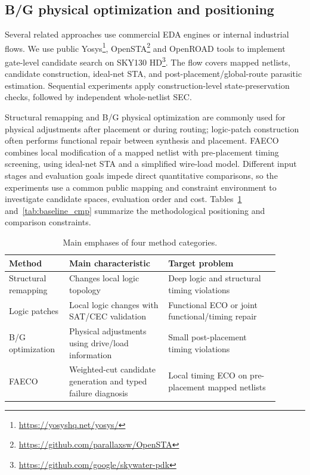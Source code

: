 \documentclass[preprint,12pt]{elsarticle}
\begin{document}
\subsection{B/G physical optimization and positioning}
Several related approaches use commercial EDA engines or internal industrial flows. We use public Yosys\footnote{\url{https://yosyshq.net/yosys/}}, OpenSTA\footnote{\url{https://github.com/parallaxsw/OpenSTA}} and OpenROAD\cite{openroad} tools to implement gate-level candidate search on SKY130 HD\footnote{\url{https://github.com/google/skywater-pdk}}. The flow covers mapped netlists, candidate construction, ideal-net STA, and post-placement/global-route parasitic estimation. Sequential experiments apply construction-level state-preservation checks, followed by independent whole-netlist SEC.

Structural remapping and B/G physical optimization are commonly used for physical adjustments after placement or during routing; logic-patch construction often performs functional repair between synthesis and placement. FAECO combines local modification of a mapped netlist with pre-placement timing screening, using ideal-net STA and a simplified wire-load model. Different input stages and evaluation goals impede direct quantitative comparisons, so the experiments use a common public mapping and constraint environment to investigate candidate spaces, evaluation order and cost. Tables~\ref{tab:related_diff} and~\ref{tab:baseline_cmp} summarize the methodological positioning and comparison constraints.

\begin{table}[htbp]
\centering\small
\caption{Main emphases of four method categories.}\label{tab:related_diff}
\begin{tabular}{p{0.20\linewidth}p{0.33\linewidth}p{0.37\linewidth}}\toprule
Method & Main characteristic & Target problem\\\midrule
Structural remapping & Changes local logic topology & Deep logic and structural timing violations\\
Logic patches & Local logic changes with SAT/CEC validation & Functional ECO or joint functional/timing repair\\
B/G optimization & Physical adjustments using drive/load information & Small post-placement timing violations\\
FAECO & Weighted-cut candidate generation and typed failure diagnosis & Local timing ECO on pre-placement mapped netlists\\\bottomrule
\end{tabular}
\end{table}
\end{document}
